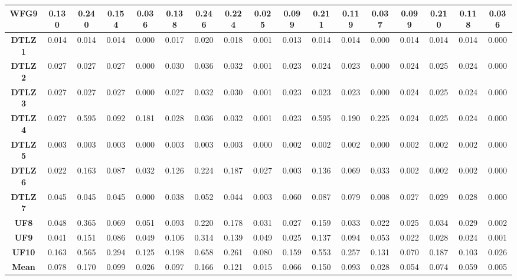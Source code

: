 \begin{table*}[t]
\begin{tabular}{c c|c|c|c|c|c|c|c|c|c|c|c|c|c|c|c}
\multicolumn{1}{c|}{\textbf{WFG9}} & 0.130 & 0.240 & 0.154 & 0.036 & 0.138 & 0.246 & 0.224 & 0.025 & 0.099 & 0.211 & 0.119 & 0.037 & 0.099 & 0.210 & 0.118 & 0.036 \\ \hline
\multicolumn{1}{c|}{\textbf{DTLZ1}} & 0.014 & 0.014 & 0.014 & 0.000 & 0.017 & 0.020 & 0.018 & 0.001 & 0.013 & 0.014 & 0.014 & 0.000 & 0.014 & 0.014 & 0.014 & 0.000 \\ \hline
\multicolumn{1}{c|}{\textbf{DTLZ2}} & 0.027 & 0.027 & 0.027 & 0.000 & 0.030 & 0.036 & 0.032 & 0.001 & 0.023 & 0.024 & 0.023 & 0.000 & 0.024 & 0.025 & 0.024 & 0.000 \\ \hline
\multicolumn{1}{c|}{\textbf{DTLZ3}} & 0.027 & 0.027 & 0.027 & 0.000 & 0.027 & 0.032 & 0.030 & 0.001 & 0.023 & 0.023 & 0.023 & 0.000 & 0.024 & 0.025 & 0.024 & 0.000 \\ \hline
\multicolumn{1}{c|}{\textbf{DTLZ4}} & 0.027 & 0.595 & 0.092 & 0.181 & 0.028 & 0.036 & 0.032 & 0.001 & 0.023 & 0.595 & 0.190 & 0.225 & 0.024 & 0.025 & 0.024 & 0.000 \\ \hline
\multicolumn{1}{c|}{\textbf{DTLZ5}} & 0.003 & 0.003 & 0.003 & 0.000 & 0.003 & 0.003 & 0.003 & 0.000 & 0.002 & 0.002 & 0.002 & 0.000 & 0.002 & 0.002 & 0.002 & 0.000 \\ \hline
\multicolumn{1}{c|}{\textbf{DTLZ6}} & 0.022 & 0.163 & 0.087 & 0.032 & 0.126 & 0.224 & 0.187 & 0.027 & 0.003 & 0.136 & 0.069 & 0.033 & 0.002 & 0.002 & 0.002 & 0.000 \\ \hline
\multicolumn{1}{c|}{\textbf{DTLZ7}} & 0.045 & 0.045 & 0.045 & 0.000 & 0.038 & 0.052 & 0.044 & 0.003 & 0.060 & 0.087 & 0.079 & 0.008 & 0.027 & 0.029 & 0.028 & 0.000 \\ \hline
\multicolumn{1}{c|}{\textbf{UF8}} & 0.048 & 0.365 & 0.069 & 0.051 & 0.093 & 0.220 & 0.178 & 0.031 & 0.027 & 0.159 & 0.033 & 0.022 & 0.025 & 0.034 & 0.029 & 0.002 \\ \hline
\multicolumn{1}{c|}{\textbf{UF9}} & 0.041 & 0.151 & 0.086 & 0.049 & 0.106 & 0.314 & 0.139 & 0.049 & 0.025 & 0.137 & 0.094 & 0.053 & 0.022 & 0.028 & 0.024 & 0.001 \\ \hline
\multicolumn{1}{c|}{\textbf{UF10}} & 0.163 & 0.565 & 0.294 & 0.125 & 0.198 & 0.658 & 0.261 & 0.080 & 0.159 & 0.553 & 0.257 & 0.131 & 0.070 & 0.187 & 0.103 & 0.026 \\ \hline
\multicolumn{1}{c|}{\textbf{Mean}} & 0.078 & 0.170 & 0.099 & 0.026 & 0.097 & 0.166 & 0.121 & 0.015 & 0.066 & 0.150 & 0.093 & 0.028 & 0.054 & 0.074 & 0.059 & 0.005 \\ \hline
\end{tabular}%
\end{table*}


